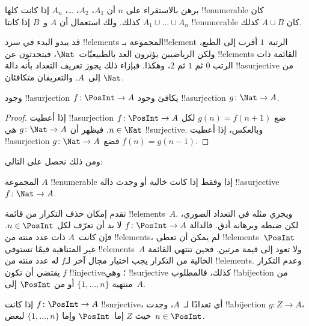 \documentclass[../../../include/open-logic-section]{subfiles}
\begin{document}
\begin{prob}
برهن بالاستقراء على $n$ أن $A_1$، $A_2$، \dots، $A_n$ إذا كانت
كلها !!{enumerable} كان $A_1 \cup \dots \cup A_n$ كذلك.
ولك استعمال أن $A$ و~$B$ إذا كانتا !!{enumerable} كان $A \cup B$ كذلك.
\end{prob}

قد يبدو البدء في سرد !!{element}s المجموعة بـ!!{element} الرتبة~$1$
أقرب إلى الطبع، ولكن الرياضيين يؤثرون العد بالطبيعيّات~$\Nat$،
فيتحدثون عن !!{element}s القائمة ذات الرتب $0$ ثم $1$ ثم $2$، وهكذا.
فبإزاء ذلك يجوز تعريف التعداد بأنه دالة !!a{surjective} من $\Nat$
إلى~$A$. والتعريفان متكافئان.

\begin{prop}
وجود !!a{surjection} $f\colon \PosInt \to A$ يكافئ وجود
!!a{surjection} $g\colon \Nat \to A$.
\end{prop}

\begin{proof}
إذا أعطيت !!a{surjection} $f\colon \PosInt \to A$ ضع $g(n) = f(n+1)$
لكل $n \in \Nat$. فيظهر أن $g\colon \Nat \to A$ هي !!{surjective}.
وبالعكس، إذا أعطيت !!a{surjection} $g\colon \Nat \to A$
فضع $f(n) = g(n-1)$.
\end{proof}

ومن ذلك نحصل على التالي:

\begin{cor}
المجموعة $A$ !!{enumerable} إذا وفقط إذا كانت خالية أو وجدت دالة
!!a{surjective} $f\colon \Nat \to A$.
\end{cor}

تقدم إمكان حذف التكرار من قائمة !!{element}s~$A$.
ويجري مثله في التعداد الصوري، لكن ضبطه وبرهانه أدق.
فالدالة $f\colon \PosInt \to A$ لا بد أن تعرّف لكل $n \in \PosInt$.
فإن كانت~$A$ ذات عدد منته من !!{element}s، لم يمكن أن تعطى
!!{element}s~$\PosInt$ غير المتناهية قيمًا تستوفي !!{element}s~$A$
ولا تعود إلى قيمة مرتين. فحين تنتهي القائمة الخالية من التكرار
يجب اختيار مجال آخر لـ$f$ له عدد منته من !!{element}s.
وعدم التكرار يقتضي أن تكون $f$ !!{injective}؛ وهي !!{surjective}
كذلك، فالمطلوب !!a{bijection} من منتهية $\{1, \dots, n\}$
أو من $\PosInt$ إلى~$A$.

\begin{prop}
إذا كانت $f\colon \PosInt \to A$ !!{surjective}، أي تعدادًا لـ~$A$،
وجدت !!a{bijection} $g\colon Z \to A$، حيث $Z$ إما~$\PosInt$
وإما $\{1, \dots, n\}$ لبعض~$n \in \PosInt$.
\end{prop}
\end{document}
